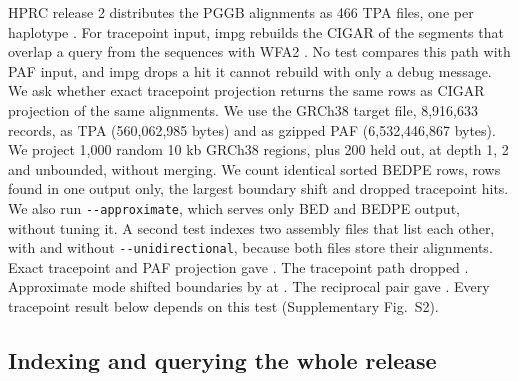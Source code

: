 HPRC release 2 distributes the PGGB alignments as 466 TPA files, one per haplotype \citep{HPRC2026resources,Guarracino2026tpa}.
For tracepoint input, impg rebuilds the CIGAR of the segments that overlap a query from the sequences with WFA2 \citep{Kaushan2026tracepoints,MarcoSola2021wfa}.
No test compares this path with PAF input, and impg drops a hit it cannot rebuild with only a debug message.
We ask whether exact tracepoint projection returns the same rows as CIGAR projection of the same alignments.
We use the GRCh38 target file, 8,916,633 records, as TPA (560,062,985 bytes) and as gzipped PAF (6,532,446,867 bytes).
We project 1,000 random 10 kb GRCh38 regions, plus 200 held out, at depth 1, 2 and unbounded, without merging.
We count identical sorted BEDPE rows, rows found in one output only, the largest boundary shift and dropped tracepoint hits.
We also run \texttt{-{}-approximate}, which serves only BED and BEDPE output, without tuning it.
A second test indexes two assembly files that list each other, with and without \texttt{-{}-unidirectional}, because both files store their alignments.
Exact tracepoint and PAF projection gave .
The tracepoint path dropped .
Approximate mode shifted boundaries by  at .
The reciprocal pair gave .
Every tracepoint result below depends on this test (Supplementary Fig.~S2).

\subsection{Indexing and querying the whole release}
\label{sec:res-release}

